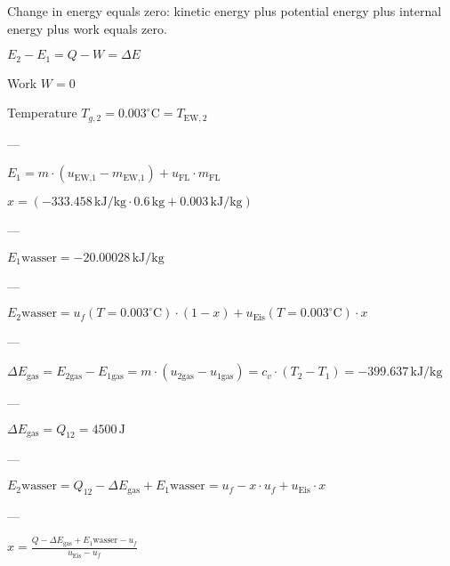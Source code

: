 Change in energy equals zero: kinetic energy plus potential energy plus internal energy plus work equals zero.

\( E_2 - E_1 = Q - W = \Delta E \)

Work \( W = 0 \)

Temperature \( T_{g,2} = 0.003^\circ \text{C} = T_{\text{EW},2} \)

---

\( E_1 = m \cdot (u_{\text{EW,1}} - m_{\text{EW,1}}) + u_{\text{FL}} \cdot m_{\text{FL}} \)

\( x = (-333.458 \, \text{kJ/kg} \cdot 0.6 \, \text{kg} + 0.003 \, \text{kJ/kg}) \)

---

\( E_1 \text{wasser} = -20.00028 \, \text{kJ/kg} \)

---

\( E_2 \text{wasser} = u_f (T = 0.003^\circ \text{C}) \cdot (1 - x) + u_{\text{Eis}} (T = 0.003^\circ \text{C}) \cdot x \)

---

\( \Delta E_{\text{gas}} = E_{2 \text{gas}} - E_{1 \text{gas}} = m \cdot (u_{2 \text{gas}} - u_{1 \text{gas}}) = c_v \cdot (T_2 - T_1) = -399.637 \, \text{kJ/kg} \)

---

\( \Delta E_{\text{gas}} = Q_{12} = 4500 \, \text{J} \)

---

\( E_2 \text{wasser} = Q_{12} - \Delta E_{\text{gas}} + E_1 \text{wasser} = u_f - x \cdot u_f + u_{\text{Eis}} \cdot x \)

---

\( x = \frac{Q - \Delta E_{\text{gas}} + E_1 \text{wasser} - u_f}{u_{\text{Eis}} - u_f} \)